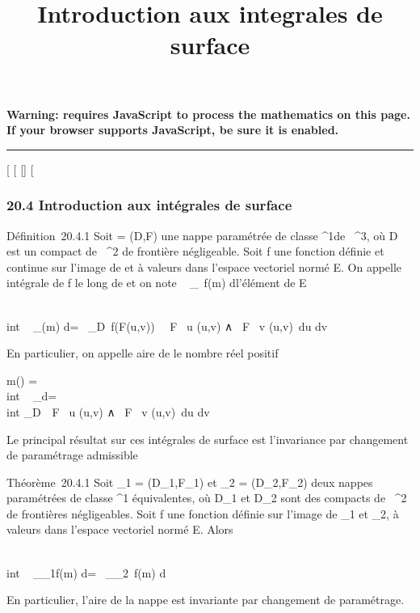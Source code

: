 \documentclass[]{article}
\title{Introduction aux integrales de surface}
\author{}
\date{}
\begin{document}
\maketitle

\textbf{Warning: 
requires JavaScript to process the mathematics on this page.\\ If your
browser supports JavaScript, be sure it is enabled.}

\begin{center}\rule{3in}{0.4pt}\end{center}

{[}
{[}
{[}{]}
{[}

\subsubsection{20.4 Introduction aux intégrales de surface}

Définition~20.4.1 Soit \Sigma = (D,F) une nappe paramétrée de classe
^1de ~^3, où D est un compact de ~^2
de frontière négligeable. Soit f une fonction définie et continue sur
l'image de \Sigma et à valeurs dans l'espace vectoriel normé E. On appelle
intégrale de f le long de \Sigma et on note \int ~
\int  _\Sigma~f(m) d\sigma l'élément de E

\int  \\int ~
_\Sigmaf(m) d\sigma =\int ~
\int  _D~f(F(u,v))
\ \partial~F \over \partial~u (u,v) ∧ \partial~F
\over \partial~v (u,v)\ du dv

En particulier, on appelle aire de \Sigma le nombre réel positif

m(\Sigma) =\int  \\int ~
_\Sigma d\sigma =\int ~ \\int
 _D\ \partial~F \over \partial~u
(u,v) ∧ \partial~F \over \partial~v (u,v)\
du dv

Le principal résultat sur ces intégrales de surface est l'invariance par
changement de paramétrage admissible

Théorème~20.4.1 Soit \Sigma_1 = (D_1,F_1) et
\Sigma_2 = (D_2,F_2) deux nappes paramétrées de
classe ^1 équivalentes, où D_1 et D_2 sont
des compacts de ~^2 de frontières négligeables. Soit f une
fonction définie sur l'image de \Sigma_1 et \Sigma_2, à valeurs
dans l'espace vectoriel normé E. Alors

\int  \\int ~
_\Sigma_1f(m) d\sigma =\int ~
\int  _\Sigma_2~f(m) d\sigma

En particulier, l'aire de la nappe est invariante par changement de
paramétrage.
\end{document}
